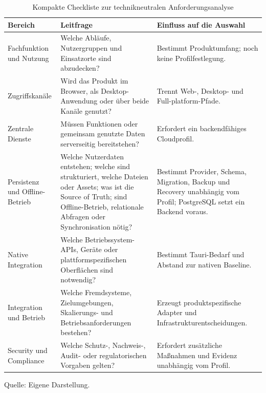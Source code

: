 \begin{table}[H]
  \centering
  \scriptsize
  \renewcommand{\arraystretch}{1.1}
  \caption{Kompakte Checkliste zur technikneutralen Anforderungsanalyse}
  \label{tab:customer-requirement-checklist}
  \begin{tabularx}{\textwidth}{@{}>{\raggedright\arraybackslash}p{}>{\raggedright\arraybackslash}p{}>{\raggedright\arraybackslash}X@{}}
    \toprule
    \textbf{Bereich} & \textbf{Leitfrage} & \textbf{Einfluss auf die Auswahl} \\
    \midrule
    Fachfunktion und Nutzung & Welche Abläufe, Nutzergruppen und Einsatzorte sind abzudecken?
      & Bestimmt Produktumfang; noch keine Profilfestlegung. \\
    Zugriffskanäle & Wird das Produkt im Browser, als Desktop-Anwendung oder über beide Kanäle genutzt?
      & Trennt Web-, Desktop- und Full-platform-Pfade. \\
    Zentrale Dienste & Müssen Funktionen oder gemeinsam genutzte Daten serverseitig bereitstehen?
      & Erfordert ein backendfähiges Cloudprofil. \\
    Persistenz und Offline-Betrieb & Welche Nutzerdaten entstehen; welche sind strukturiert, welche Dateien oder Assets; was ist die Source of Truth; sind Offline-Betrieb, relationale Abfragen oder Synchronisation nötig?
      & Bestimmt Provider, Schema, Migration, Backup und Recovery unabhängig vom Profil; PostgreSQL setzt ein Backend voraus. \\
    Native Integration & Welche Betriebssystem-APIs, Geräte oder plattformspezifischen Oberflächen sind notwendig?
      & Bestimmt Tauri-Bedarf und Abstand zur nativen Baseline. \\
    Integration und Betrieb & Welche Fremdsysteme, Zielumgebungen, Skalierungs- und Betriebsanforderungen bestehen?
      & Erzeugt produktspezifische Adapter und Infrastrukturentscheidungen. \\
    Security und Compliance & Welche Schutz-, Nachweis-, Audit- oder regulatorischen Vorgaben gelten?
      & Erfordert zusätzliche Maßnahmen und Evidenz unabhängig vom Profil. \\
    \bottomrule
  \end{tabularx}
  \smallskip
  {\footnotesize Quelle: Eigene Darstellung.\par}
\end{table}
